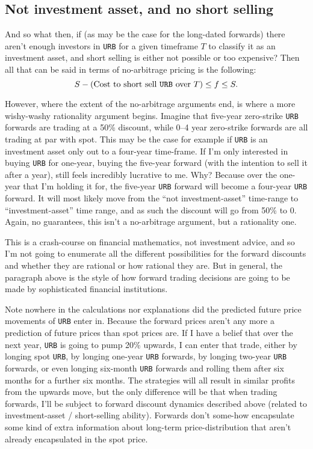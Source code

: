 \documentclass{article}
\begin{document}
	\subsection{Not investment asset, and no short selling}
	And so what then, if (as may be the case for the long-dated forwards) there aren't enough investors in \texttt{URB} for a given timeframe $T$ to classify it as an investment asset, and short selling is either not possible or too expensive? Then all that can be said in terms of no-arbitrage pricing is the following:
	\begin{equation}
		S - (\text{Cost to short sell \texttt{URB} over }T)\leq f \leq S.
	\end{equation}
	
	However, where the extent of the no-arbitrage arguments end, is where a more wishy-washy rationality argument begins. Imagine that five-year zero-strike \texttt{URB} forwards are trading at a 50\% discount, while 0--4 year zero-strike forwards are all trading at par with spot. This may be the case for example if \texttt{URB} is an investment asset only out to a four-year time-frame. If I'm only interested in buying \texttt{URB} for one-year, buying the five-year forward (with the intention to sell it after a year), still feels incredibly lucrative to me. Why? Because over the one-year that I'm holding it for, the five-year \texttt{URB} forward will become a four-year \texttt{URB} forward. It will most likely move from the ``not investment-asset'' time-range to ``investment-asset'' time range, and as such the discount will go from 50\% to 0. Again, no guarantees, this isn't a no-arbitrage argument, but a rationality one.
	
	This is a crash-course on financial mathematics, not investment advice, and so I'm not going to enumerate all the different possibilities for the forward discounts and whether they are rational or how rational they are. But in general, the paragraph above is the style of how forward trading decisions are going to be made by sophisticated financial institutions.
	
	Note nowhere in the calculations nor explanations did the predicted future price movements of \texttt{URB} enter in. Because the forward prices aren't any more a prediction of future prices than spot prices are. If I have a belief that over the next year, \texttt{URB} is going to pump 20\% upwards, I can enter that trade, either by longing spot \texttt{URB}, by longing one-year \texttt{URB} forwards, by longing two-year \texttt{URB} forwards, or even longing six-month \texttt{URB} forwards and rolling them after six months for a further six months. The strategies will all result in similar profits from the upwards move, but the only difference will be that when trading forwards, I'll be subject to forward discount dynamics described above (related to investment-asset / short-selling ability). Forwards don't some-how encapsulate some kind of extra information about long-term price-distribution that aren't already encapsulated in the spot price.
	
\end{document}
